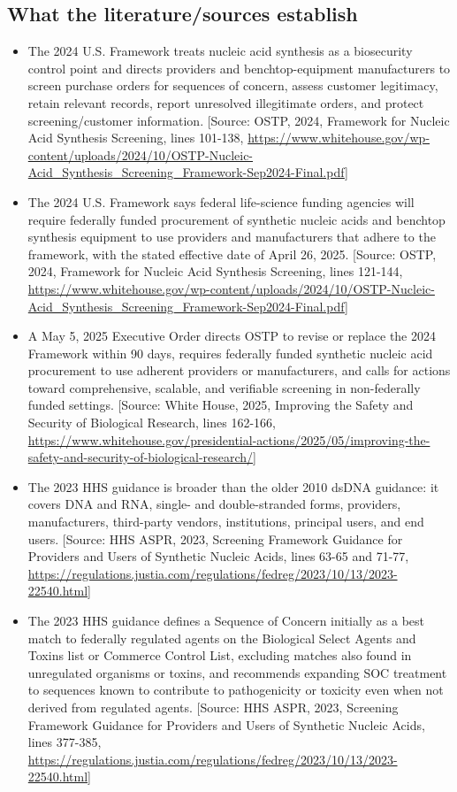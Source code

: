 \documentclass[11pt]{report}
\begin{document}
\subsection{What the literature/sources establish}
\begin{itemize}
\item The 2024 U.S. Framework treats nucleic acid synthesis as a biosecurity control point and directs providers and benchtop-equipment manufacturers to screen purchase orders for sequences of concern, assess customer legitimacy, retain relevant records, report unresolved illegitimate orders, and protect screening/customer information. [Source: OSTP, 2024, Framework for Nucleic Acid Synthesis Screening, lines 101-138, \url{https://www.whitehouse.gov/wp-content/uploads/2024/10/OSTP-Nucleic-Acid_Synthesis_Screening_Framework-Sep2024-Final.pdf}]
\item The 2024 U.S. Framework says federal life-science funding agencies will require federally funded procurement of synthetic nucleic acids and benchtop synthesis equipment to use providers and manufacturers that adhere to the framework, with the stated effective date of April 26, 2025. [Source: OSTP, 2024, Framework for Nucleic Acid Synthesis Screening, lines 121-144, \url{https://www.whitehouse.gov/wp-content/uploads/2024/10/OSTP-Nucleic-Acid_Synthesis_Screening_Framework-Sep2024-Final.pdf}]
\item A May 5, 2025 Executive Order directs OSTP to revise or replace the 2024 Framework within 90 days, requires federally funded synthetic nucleic acid procurement to use adherent providers or manufacturers, and calls for actions toward comprehensive, scalable, and verifiable screening in non-federally funded settings. [Source: White House, 2025, Improving the Safety and Security of Biological Research, lines 162-166, \url{https://www.whitehouse.gov/presidential-actions/2025/05/improving-the-safety-and-security-of-biological-research/}]
\item The 2023 HHS guidance is broader than the older 2010 dsDNA guidance: it covers DNA and RNA, single- and double-stranded forms, providers, manufacturers, third-party vendors, institutions, principal users, and end users. [Source: HHS ASPR, 2023, Screening Framework Guidance for Providers and Users of Synthetic Nucleic Acids, lines 63-65 and 71-77, \url{https://regulations.justia.com/regulations/fedreg/2023/10/13/2023-22540.html}]
\item The 2023 HHS guidance defines a Sequence of Concern initially as a best match to federally regulated agents on the Biological Select Agents and Toxins list or Commerce Control List, excluding matches also found in unregulated organisms or toxins, and recommends expanding SOC treatment to sequences known to contribute to pathogenicity or toxicity even when not derived from regulated agents. [Source: HHS ASPR, 2023, Screening Framework Guidance for Providers and Users of Synthetic Nucleic Acids, lines 377-385, \url{https://regulations.justia.com/regulations/fedreg/2023/10/13/2023-22540.html}]

\end{itemize}
\end{document}
